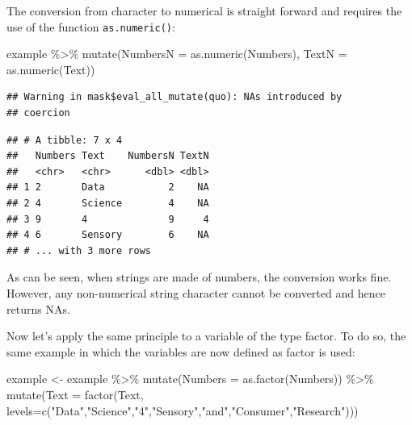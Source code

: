 \documentclass[
]{krantz}
\makeatletter
\newenvironment{Shaded}{\begin{snugshade}}{\end{snugshade}}
\newcommand{\AttributeTok}[1]{\textcolor[rgb]{0.61,0.61,0.61}{#1}}
\newcommand{\FunctionTok}[1]{\textcolor[rgb]{0,0,0}{#1}}
\newcommand{\NormalTok}[1]{#1}
\newcommand{\OtherTok}[1]{\textcolor[rgb]{0.37,0.37,0.37}{#1}}
\newcommand{\SpecialCharTok}[1]{\textcolor[rgb]{0,0,0}{#1}}
\newcommand{\StringTok}[1]{\textcolor[rgb]{0.5,0.5,0.5}{#1}}
\newenvironment{kframe}{%
\medskip{}
\setlength{\fboxsep}{.8em}
 \def\at@end@of@kframe{}%
 \ifinner\ifhmode%
  \def\at@end@of@kframe{\end{minipage}}%
  \begin{minipage}{\columnwidth}%
 \fi\fi%
 \def\FrameCommand##1{\hskip\@totalleftmargin \hskip-\fboxsep
 \colorbox{shadecolor}{##1}\hskip-\fboxsep
     \hskip-\linewidth \hskip-\@totalleftmargin \hskip\columnwidth}%
 \MakeFramed {\advance\hsize-\width
   \@totalleftmargin\z@ \linewidth\hsize
   \@setminipage}}%
 {\par\unskip\endMakeFramed%
 \at@end@of@kframe}
\renewenvironment{Shaded}{\begin{kframe}}{\end{kframe}}
\makeatother
\begin{document}
The conversion from character to numerical is straight forward and requires the use of the function \texttt{as.numeric()}:

\begin{Shaded}
\begin{Highlighting}[]
\NormalTok{example }\SpecialCharTok{\%\textgreater{}\%} 
  \FunctionTok{mutate}\NormalTok{(}\AttributeTok{NumbersN =} \FunctionTok{as.numeric}\NormalTok{(Numbers), }\AttributeTok{TextN =} \FunctionTok{as.numeric}\NormalTok{(Text))}
\end{Highlighting}
\end{Shaded}

\begin{verbatim}
## Warning in mask$eval_all_mutate(quo): NAs introduced by
## coercion
\end{verbatim}

\begin{verbatim}
## # A tibble: 7 x 4
##   Numbers Text    NumbersN TextN
##   <chr>   <chr>      <dbl> <dbl>
## 1 2       Data           2    NA
## 2 4       Science        4    NA
## 3 9       4              9     4
## 4 6       Sensory        6    NA
## # ... with 3 more rows
\end{verbatim}

As can be seen, when strings are made of numbers, the conversion works fine. However, any non-numerical string character cannot be converted and hence returns NAs.

Now let's apply the same principle to a variable of the type factor. To do so, the same example in which the variables are now defined as factor is used:

\begin{Shaded}
\begin{Highlighting}[]
\NormalTok{example }\OtherTok{\textless{}{-}}\NormalTok{ example }\SpecialCharTok{\%\textgreater{}\%} 
  \FunctionTok{mutate}\NormalTok{(}\AttributeTok{Numbers =} \FunctionTok{as.factor}\NormalTok{(Numbers)) }\SpecialCharTok{\%\textgreater{}\%} 
  \FunctionTok{mutate}\NormalTok{(}\AttributeTok{Text =} \FunctionTok{factor}\NormalTok{(Text, }\AttributeTok{levels=}\FunctionTok{c}\NormalTok{(}\StringTok{"Data"}\NormalTok{,}\StringTok{"Science"}\NormalTok{,}\StringTok{"4"}\NormalTok{,}\StringTok{"Sensory"}\NormalTok{,}\StringTok{"and"}\NormalTok{,}\StringTok{"Consumer"}\NormalTok{,}\StringTok{"Research"}\NormalTok{)))}
\end{Highlighting}
\end{Shaded}
\end{document}
